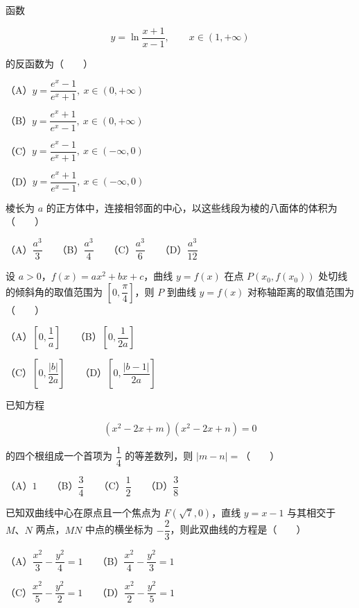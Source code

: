 \begin{question}
函数

\nopagebreak[4]
\[
y=\ln\frac{x+1}{x-1},\qquad x\in(1,+\infty)
\]

的反函数为\mbox{（　　）}

（A）$y=\dfrac{e^x-1}{e^x+1},\ x\in(0,+\infty)$

（B）$y=\dfrac{e^x+1}{e^x-1},\ x\in(0,+\infty)$

（C）$y=\dfrac{e^x-1}{e^x+1},\ x\in(-\infty,0)$

（D）$y=\dfrac{e^x+1}{e^x-1},\ x\in(-\infty,0)$

\end{question}
\begin{question}
棱长为 $a$ 的正方体中，连接相邻面的中心，以这些线段为棱的八面体的体积为\mbox{（　　）}

（A）$\dfrac{a^3}{3}$　　（B）$\dfrac{a^3}{4}$　　（C）$\dfrac{a^3}{6}$　　（D）$\dfrac{a^3}{12}$

\end{question}
\begin{question}
设 $a>0$，$f(x)=ax^2+bx+c$，曲线 $y=f(x)$ 在点 $P(x_0,f(x_0))$ 处切线的倾斜角的取值范围为 $\left[0,\dfrac\pi4\right]$，则 $P$ 到曲线 $y=f(x)$ 对称轴距离的取值范围为\mbox{（　　）}

（A）$\left[0,\dfrac1a\right]$　　（B）$\left[0,\dfrac1{2a}\right]$

（C）$\left[0,\dfrac{|b|}{2a}\right]$　　（D）$\left[0,\dfrac{|b-1|}{2a}\right]$

\end{question}
\begin{question}
已知方程

\nopagebreak[4]
\[
(x^2-2x+m)(x^2-2x+n)=0
\]

的四个根组成一个首项为 $\dfrac14$ 的等差数列，则 $|m-n|=$\mbox{（　　）}

（A）$1$　　（B）$\dfrac34$　　（C）$\dfrac12$　　（D）$\dfrac38$

\end{question}
\begin{question}
已知双曲线中心在原点且一个焦点为 $F(\sqrt7,0)$，直线 $y=x-1$ 与其相交于 $M\text{、}N$ 两点，$MN$ 中点的横坐标为 $-\dfrac23$，则此双曲线的方程是\mbox{（　　）}

（A）$\dfrac{x^2}{3}-\dfrac{y^2}{4}=1$　　（B）$\dfrac{x^2}{4}-\dfrac{y^2}{3}=1$

（C）$\dfrac{x^2}{5}-\dfrac{y^2}{2}=1$　　（D）$\dfrac{x^2}{2}-\dfrac{y^2}{5}=1$

\end{question}
